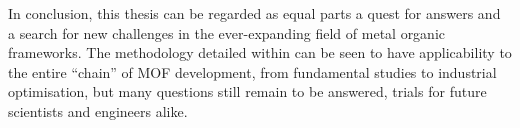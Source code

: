 In conclusion, this thesis can be regarded as equal parts a quest for
answers and a search for new challenges in the ever-expanding 
field of metal organic frameworks. The methodology detailed within
can be seen to have applicability to the entire ``chain'' of
\gls{MOF} development, from fundamental studies to industrial optimisation,
but many questions still remain to be answered, trials for future
scientists and engineers alike.

\pagebreak

